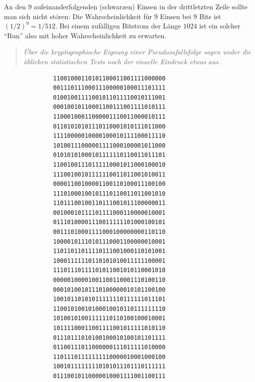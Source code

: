 \begin{refsegment}
An den 9 aufeinanderfolgenden (schwarzen) Einsen in der drittletzten
Zeile sollte man sich nicht stören: Die Wahrscheinlichkeit für 9 Einsen
bei 9 Bits ist
$(1/2)^9 = 1/512$. Bei einem zufälligen Bitstrom der Länge $1024$ ist
ein solcher "`Run"' also mit hoher Wahrscheinlichkeit zu erwarten.

\begin{quote}
   {\em Über die kryptographische Eignung einer Pseudozufallsfolge
   sagen weder die üblichen statistischen Tests noch der visuelle Eindruck etwas
   aus.}
\end{quote}

\begin{table}[htbp]
\begin{verbatim}
              11001000110101100011001111000000
              00111011100011100000100011101111
              01001001111001011011110010111001
              00010010110001100111001111010111
              11000100011000001110011000010111
              01101010101110110001010111011000
              11110000010000100010111100011110
              10100111000001111000100001011000
              01010101000101111110110011011101
              11001001110111110001011000100010
              11100100101111110011011001010011
              00001100100001100110100011100100
              11101000100101110110011011001010
              11011100100110111001011100000011
              00100010111101111000110000010001
              01110100001110011111101000100101
              00111010001111000100000000110110
              10000101110101110001100000010001
              11011011011110111001000110101001
              10001111110110101010011111100001
              11101110111101011001010110001010
              00000100001001100110001110100110
              00010100101110100000010101100100
              10010110101011111110111111011101
              11001010010100010010110111111110
              10100101001111110110100100010001
              10111100011001111001011111010110
              01110111010100100010100101101111
              01100111011000000111011111010000
              11011101111111110000010001000100
              10010111111110101011101110111111
              01110010110000010001111001100111
\end{verbatim}
\caption{Eine pseudozufälligen Bitfolge aus einem
   linearen
	Schieberegister (LSFR)}\label{Sage-code-bool-psr}
\end{table}


\end{refsegment}
